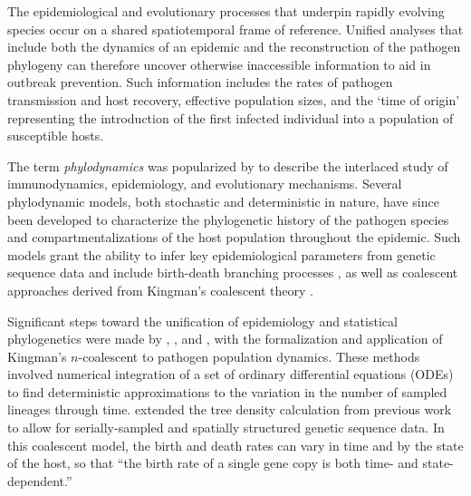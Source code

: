 \documentclass[12pt,titlepage]{article}
\begin{document}
The epidemiological and evolutionary processes that underpin rapidly evolving 
species occur on a shared spatiotemporal frame of reference.  Unified analyses 
that include both the dynamics of an epidemic and the reconstruction of the pathogen phylogeny can 
therefore uncover otherwise inaccessible information to aid in outbreak prevention.  Such information 
includes the rates of pathogen transmission and host recovery, effective population sizes, and the `time of origin' representing the 
introduction of the first infected individual into a population of susceptible hosts.

The term \textit{phylodynamics} was popularized by \cite{Grenfell16012004} to describe the interlaced study of immunodynamics, 
epidemiology, and evolutionary mechanisms.  Several phylodynamic models, both 
stochastic and deterministic in nature, have since been developed to characterize the 
phylogenetic history of the pathogen species and compartmentalizations of the host 
population throughout the epidemic.  Such models grant the ability to infer 
key epidemiological parameters from genetic sequence data and include birth-death 
branching processes \citep{Stadler:2012,Stadler:2013,Kuhnert:2014,gavryushkina2014bayesian}, as well as 
coalescent approaches \citep{GriffithsandTavare:1994,Pybus22062001, KoelleandRasmussen, Rasmussen2011, DearloveandWilson,Rasmussen2014} derived from 
Kingman's coalescent theory \citep{Kingman:1982}.

Significant steps toward the unification of epidemiology and
statistical phylogenetics were made by \cite{Pybus:2001}, \cite{DearloveandWilson}, and 
\cite{Volz:2009}, with the formalization and application of Kingman's $n$-coalescent to pathogen population
dynamics. These methods involved numerical integration
of a set of ordinary differential equations (ODEs) to find deterministic approximations to the variation in the number of sampled
lineages through time. 
\cite{Volz:2012} extended the tree density calculation from previous work \citep{Volz:2009} to allow for
serially-sampled and spatially structured genetic sequence data.  In
this coalescent model, the birth and death rates can vary in time and
by the state of the host, so that ``the birth rate of a single gene
copy is both time- and state-dependent.''
\end{document}
